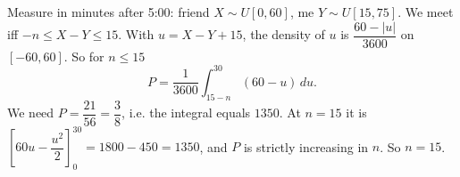 Measure in minutes after 5:00: friend $X\sim U[0,60]$, me $Y\sim U[15,75]$. We meet iff $-n\le X-Y\le15$. With $u=X-Y+15$, the density of $u$ is $\dfrac{60-|u|}{3600}$ on $[-60,60]$. So for $n\le15$
\[P=\dfrac1{3600}\int_{15-n}^{30}(60-u)\,du.\]
We need $P=\dfrac{21}{56}=\dfrac38$, i.e. the integral equals $1350$. At $n=15$ it is $\left[60u-\dfrac{u^2}2\right]_0^{30}=1800-450=1350$, and $P$ is strictly increasing in $n$. So $n=\boxed{15}$.
